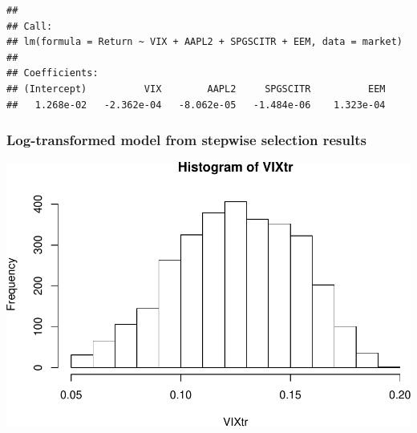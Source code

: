 \documentclass[]{article}
\newenvironment{Shaded}{\begin{snugshade}}{\end{snugshade}}
\newcommand{\KeywordTok}[1]{\textcolor[rgb]{0.13,0.29,0.53}{\textbf{#1}}}
\newcommand{\DecValTok}[1]{\textcolor[rgb]{0.00,0.00,0.81}{#1}}
\newcommand{\StringTok}[1]{\textcolor[rgb]{0.31,0.60,0.02}{#1}}
\newcommand{\OperatorTok}[1]{\textcolor[rgb]{0.81,0.36,0.00}{\textbf{#1}}}
\newcommand{\NormalTok}[1]{#1}
\begin{document}
\begin{verbatim}
## 
## Call:
## lm(formula = Return ~ VIX + AAPL2 + SPGSCITR + EEM, data = market)
## 
## Coefficients:
## (Intercept)          VIX        AAPL2     SPGSCITR          EEM  
##   1.268e-02   -2.362e-04   -8.062e-05   -1.484e-06    1.323e-04
\end{verbatim}

\subsubsection{Log-transformed model from stepwise selection
results}\label{log-transformed-model-from-stepwise-selection-results}

\begin{Shaded}
\end{Shaded}

\includegraphics{report_files/figure-latex/unnamed-chunk-16-1.pdf}

\begin{Shaded}
\end{Shaded}
\end{document}
